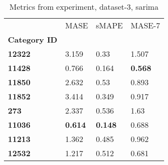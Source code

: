 \begin{table}[H]
\centering
\caption{Metrics from experiment, dataset-3, sarima}
\label{table:sarima-dataset-3}
\begin{tabular}{llll}
\toprule
{} &            MASE &           sMAPE &          MASE-7 \\
\textbf{Category ID} &                 &                 &                 \\
\midrule
\textbf{12322      } &           3.159 &            0.33 &           1.507 \\
\textbf{11428      } &           0.766 &           0.164 &  \textbf{0.568} \\
\textbf{11850      } &           2.632 &            0.53 &           0.893 \\
\textbf{11852      } &           3.414 &           0.349 &           0.917 \\
\textbf{273        } &           2.337 &           0.536 &            1.63 \\
\textbf{11036      } &  \textbf{0.614} &  \textbf{0.148} &           0.688 \\
\textbf{11213      } &           1.362 &           0.485 &           0.962 \\
\textbf{12532      } &           1.217 &           0.512 &           0.681 \\
\bottomrule
\end{tabular}
\end{table}
